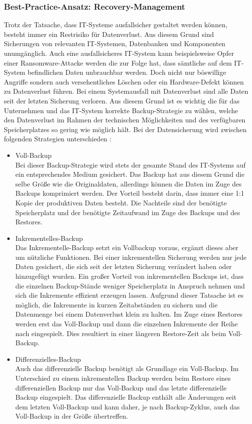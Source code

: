 \subsubsection{Best-Practice-Ansatz: Recovery-Management}
Trotz der Tatsache, dass IT-Systeme ausfallsicher gestaltet werden können, besteht immer ein Restrisiko für Datenverlust. Aus diesem Grund sind Sicherungen von relevanten IT-Systemen, Datenbanken und Komponenten unumgänglich. Auch eine ausfallsicheres IT-System kann beispielsweise Opfer einer Ransomware-Attacke werden die zur Folge hat, dass sämtliche auf dem IT-System befindlichen Daten unbrauchbar werden. Doch nicht nur böswillige Angriffe sondern auch versehentliches Löschen oder ein Hardware-Defekt können zu Datenverlust führen. Bei einem Systemausfall mit Datenverlust sind alle Daten seit der letzten Sicherung verloren. Aus diesem Grund ist es wichtig die für das Unternehmen und das IT-System korrekte Backup-Strategie zu wählen, welche den Datenverlust im Rahmen der technischen Möglichkeiten und des verfügbaren Speicherplatzes so gering wie möglich hält.
\bigbreak
Bei der Datensicherung wird zwischen folgenden Strategien unterschieden \autocite{BeardBradley2018BBaR}:
\begin{itemize}
    \item Voll-Backup\\
    Bei dieser Backup-Strategie wird stets der gesamte Stand des IT-Systems auf ein entsprechendes Medium gesichert. Das Backup hat aus diesem Grund die selbe Größe wie die Originaldaten, allerdings können die Daten im Zuge des Backups komprimiert werden. Der Vorteil besteht darin, dass immer eine 1:1 Kopie der produktiven Daten besteht. Die Nachteile sind der benötigte Speicherplatz und der benötigte Zeitaufwand im Zuge des Backups und des Restores. 
    \item Inkrementelles-Backup\\
    Das Inkrementelle-Backup setzt ein Vollbackup voraus, ergänzt dieses aber um nützliche Funktionen. Bei einer inkrementellen Sicherung werden nur jede Daten gesichert, die sich seit der letzten Sicherung verändert haben oder hinzugefügt wurden. Ein großer Vorteil von inkrementellen Backups ist, dass die einzelnen Backup-Stände weniger Speicherplatz in Anspruch nehmen und sich die Inkremente effizient erzeugen lassen. Aufgrund dieser Tatsache ist es möglich, die Inkremente in kurzen Zeitabständen zu sichern und die Datenmenge bei einem Datenverlust klein zu halten. Im Zuge eines Restores werden erst das Voll-Backup und dann die einzelnen Inkremente der Reihe nach eingespielt. Dies resultiert in einer längeren Restore-Zeit als beim Voll-Backup.
    \item Differenzielles-Backup\\
    Auch das differenzielle Backup benötigt als Grundlage ein Voll-Backup. Im Unterschied zu einem inkrementellen Backup werden beim Restore eines differenziellen Backup nur das Voll-Backup und das letzte differenzielle Backup eingespielt. Das differenzielle Backup enthält alle Änderungen seit dem letzten Voll-Backup und kann daher, je nach Backup-Zyklus, auch das Voll-Backup in der Größe übertreffen.
\end{itemize}

